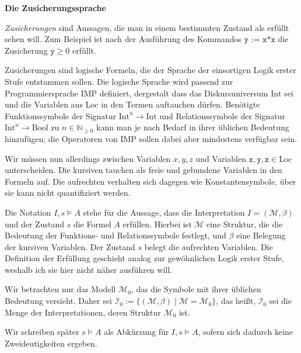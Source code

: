 \documentclass[8pt,fleqn,aspectratio=169]{beamer}
\newcommand{\strong}[1]{\textsf{\textbf{#1}}}
\newcommand{\centerheadline}[1]{%
  \begin{center}\strong{#1}\end{center}}
\newcommand{\parspace}{\vspace{0.8em}}
\newcommand{\code}[1]{{\texttt{#1}}}
\newcommand{\Bool}{\mathrm{Bool}}
\newcommand{\Int}{\mathrm{Int}}
\newcommand{\Loc}{\mathrm{Loc}}
\newcommand{\N}{\mathbb N}
\begin{document}
\begin{frame}
\centerheadline{Die Zusicherungssprache}
\end{frame}

\begin{frame}
\emph{Zusicherungen} sind Aussagen, die man in einem bestimmten Zustand als
erfüllt sehen will. Zum Beispiel ist nach der Ausführung des Kommandos
$\code{y := x*x}$ die Zusicherung $\code{y}\ge 0$
erfüllt.\pause

\parspace
Zusicherungen sind logische Formeln, die der Sprache der einsortigen Logik
erster Stufe entstammen sollen. Die logische Sprache wird passend zur
Programmiersprache IMP definiert, dergestalt dass das Diskursuniversum
$\Int$ sei und die Variablen aus $\Loc$ in den Termen auftauchen dürfen.
Benötigte Funktionssymbole der Signatur $\Int^n\to\Int$ und
Relationssymbole der Signatur $\Int^n\to\Bool$ zu $n\in\N_{\ge 0}$ kann man
je nach Bedarf in ihrer üblichen Bedeutung hinzufügen; die Operatoren
von IMP sollen dabei aber mindestens verfügbar sein.\pause

\parspace
Wir müssen nun allerdings zwischen Variablen $x,y,z$ und Variablen
$\code{x},\code{y},\code{z}\in\Loc$ unterscheiden. Die kursiven tauchen
als freie und gebundene Variablen in den Formeln auf. Die aufrechten
verhalten sich dagegen wie Konstantensymbole, über sie kann nicht
quantifiziert werden.
\end{frame}

\begin{frame}
Die Notation $I,s\models A$ stehe für die Aussage, dass
die Interpretation $I=(\mathcal M,\beta)$ und der Zustand $s$
die Formel $A$ erfüllen. Hierbei ist $\mathcal M$ eine Struktur, die
die Bedeutung der Funktions- und Relationssymbole festlegt,
und $\beta$ eine Belegung der kursiven Variablen. Der Zustand $s$
belegt die aufrechten Variablen. {\footnotesize Die Definition der
Erfüllung geschieht analog zur gewöhnlichen Logik erster Stufe, weshalb
ich sie hier nicht näher ausführen will.}\pause

\parspace
Wir betrachten nur das Modell $\mathcal M_0$, das die Symbole mit ihrer üblichen
Bedeutung versieht. Daher sei $\mathcal I_0:=\{(\mathcal M,\beta)\mid\mathcal M=\mathcal M_0\}$,
das heißt, $\mathcal I_0$ sei die Menge der Interpretationen, deren Struktur
$\mathcal M_0$ ist.\pause

\parspace
Wir schreiben später $s\models A$ als Abkürzung für $I,s\models A$,
sofern sich dadurch keine Zweideutigkeiten ergeben.
\end{frame}
\end{document}

